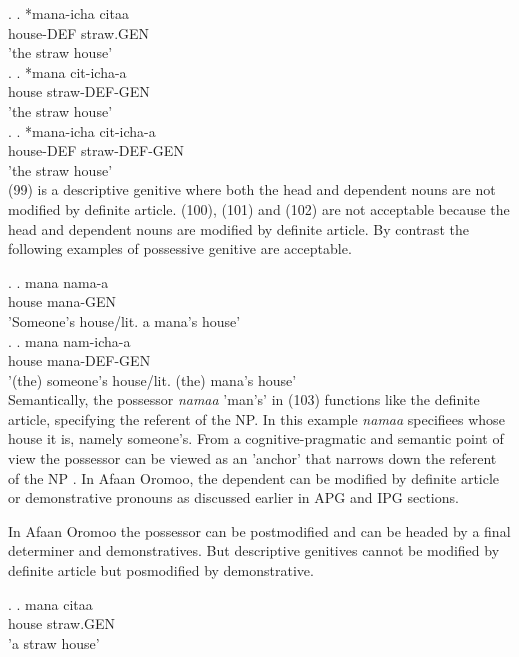 \documentclass[11pt,a4paper]{article}
\begin{document}
	\ex.
	\ag.
	*mana-icha citaa \\
	house-DEF straw.GEN\\
	'the straw house'\\
	
	\ex.
	\ag.
	*mana cit-icha-a \\
	house straw-DEF-GEN\\
	'the straw house'\\
	
	\ex.
	\ag.
	*mana-icha cit-icha-a \\
	house-DEF straw-DEF-GEN\\
	'the straw house'\\
	
	(99) is a descriptive genitive where both the head and dependent nouns are not modified by definite article. (100), (101) and (102) are not acceptable because the head and dependent nouns are modified by definite article. By contrast the following examples of possessive genitive are acceptable.
	
	\ex.
	\ag.
	mana nama-a\\
	house mana-GEN\\
	'Someone's house/lit. a mana's house'\\
	

	\ex.
	\ag.
	mana nam-icha-a\\
	house mana-DEF-GEN\\
	'(the) someone's house/lit. (the) mana's house'\\
	
	Semantically, the possessor \emph{namaa} 'man's' in (103) functions like the definite article, specifying the referent of the NP. In this example \emph{namaa} specifiees whose house it is, namely someone's. From a cognitive-pragmatic and semantic point of view the possessor can be viewed as an 'anchor' that narrows down the referent of the NP \cite[80]{rosenbach2006descriptive}. In Afaan Oromoo, the dependent can be modified by definite article or demonstrative pronouns as discussed earlier in APG and IPG sections.
	
	In Afaan Oromoo the possessor can be postmodified and can be headed by a final determiner and demonstratives. But descriptive genitives cannot be modified by definite article but posmodified by demonstrative.
	
	\ex.
	\ag.
	mana citaa \\
	house straw.GEN\\
	'a straw house'\\
	
\end{document}
